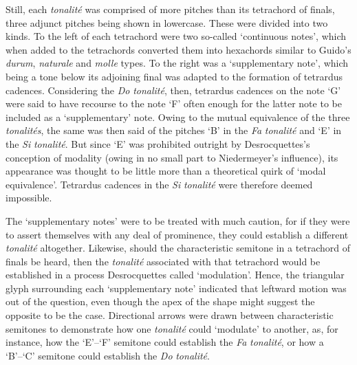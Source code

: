 Still, each \emph{tonalité} was comprised of more pitches than its tetrachord of finals, three adjunct pitches being shown in lowercase.
These were divided into two kinds.
To the left of each tetrachord were two so-called `continuous notes', which when added to the tetrachords converted them into hexachords similar to Guido's \emph{durum}, \emph{naturale} and \emph{molle} types.
To the right was a `supplementary note', which being a tone below its adjoining final was adapted to the formation of tetrardus cadences.
Considering the \emph{Do} \emph{tonalité}, then, tetrardus cadences on the note `G' were said to have recourse to the note `F' often enough for the latter note to be included as a `supplementary' note.
Owing to the mutual equivalence of the three \emph{tonalités}, the same was then said of the pitches `B'\kern 1pt\flat{} in the \emph{Fa} \emph{tonalité} and `E'\kern 1pt\flat{} in the \emph{Si}\kern 1pt\flat{} \emph{tonalité}.
But since `E'\kern 1pt\flat{} was prohibited outright by Desrocquettes's conception of modality (owing in no small part to Niedermeyer's influence), its appearance was thought to be little more than a theoretical quirk of `modal equivalence'.
Tetrardus cadences in the \emph{Si}\kern 1pt\flat{} \emph{tonalité} were therefore deemed impossible.

The `supplementary notes' were to be treated with much caution, for if they were to assert themselves with any deal of prominence, they could establish a different \emph{tonalité} altogether.
Likewise, should the characteristic semitone in a tetrachord of finals be heard, then the \emph{tonalité} associated with that tetrachord would be established in a process Desrocquettes called `modulation'.
Hence, the triangular glyph surrounding each `supplementary note' indicated that leftward motion was out of the question, even though the apex of the shape might suggest the opposite to be the case.
Directional arrows were drawn between characteristic semitones to demonstrate how one \emph{tonalité} could `modulate' to another, as, for instance, how the `E'--`F' semitone could establish the \emph{Fa} \emph{tonalité}, or how a `B'\kern 1pt\natural{}--`C' semitone could establish the \emph{Do} \emph{tonalité}.

